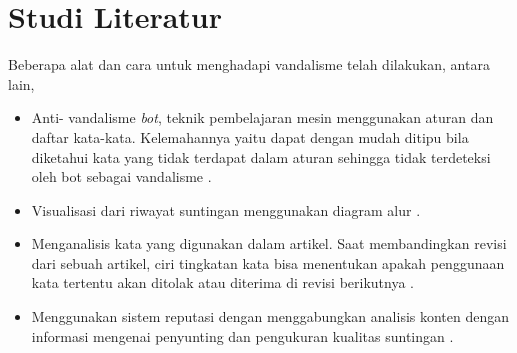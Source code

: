 \section{Studi Literatur}\label{sec:studi-literatur}

Beberapa alat dan cara untuk menghadapi vandalisme telah dilakukan, antara lain,

\begin{itemize}
	\item Anti- vandalisme \textit{bot}, teknik pembelajaran mesin menggunakan aturan dan daftar kata-kata. Kelemahannya yaitu dapat dengan mudah ditipu bila diketahui kata yang tidak terdapat dalam aturan sehingga tidak terdeteksi oleh bot sebagai vandalisme \cite{Smets08automaticvandalism}.
	\item Visualisasi dari riwayat suntingan menggunakan diagram alur \cite{viegas2004studying}.
	\item Menganalisis kata yang digunakan dalam artikel. Saat membandingkan revisi dari sebuah artikel, ciri tingkatan kata bisa menentukan apakah penggunaan kata tertentu akan ditolak atau diterima di revisi berikutnya \cite{rzeszotarski2012learning}.
	\item Menggunakan sistem reputasi dengan menggabungkan analisis konten  dengan informasi mengenai penyunting dan pengukuran kualitas suntingan \cite{adler2010detecting}.
\end{itemize}